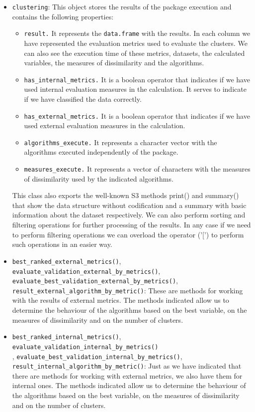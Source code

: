 \begin{itemize}
    \item \texttt{clustering}: This object stores the results of the  package execution and contains the following properties:
    \begin{itemize}
        \item \texttt{result.} It represents the \texttt{data.frame} with the results. In each column we have represented the evaluation metrics used to evaluate the clusters. We can also see the execution time of these metrics, datasets, the calculated variables, the measures of dissimilarity and the algorithms.
        \item \texttt{has\_internal\_metrics.} It is a boolean operator that indicates if we have used internal evaluation measures in the calculation. It serves to indicate if we have classified the data correctly.
        \item \texttt{has\_external\_metrics.} It is a boolean operator that indicates if we have used external evaluation measures in the calculation.
        \item \texttt{algorithms\_execute.} It represents a character vector with the algorithms executed independently of the package.
        \item \texttt{measures\_execute.} It represents a vector of characters with the measures of dissimilarity used by the indicated algorithms.
    \end{itemize}
    This class also exports the well-known S3 methods print() and summary() that show the data
structure without codification and a summary with basic information about the dataset respectively. We can also perform sorting and filtering operations for further processing of the results. In any case if we need to perform filtering operations we can overload the operator ('[') to perform such operations in an easier way.
    \item \texttt{best\_ranked\_external\_metrics()}, \texttt{evaluate\_validation\_external\_by\_metrics()},\\ \texttt{evaluate\_best\_validation\_external\_by\_metrics()},\\ \texttt{result\_external\_algorithm\_by\_metric()}:
    These are methods for working with the results of external metrics. The methods indicated allow us to determine the behaviour of the algorithms based on the best variable, on the measures of dissimilarity and on the number of clusters.

    \item \texttt{best\_ranked\_internal\_metrics()}, \texttt{evaluate\_validation\_internal\_by\_metrics()}\\, \texttt{evaluate\_best\_validation\_internal\_by\_metrics()},\\ \texttt{result\_internal\_algorithm\_by\_metric()}: Just as we have indicated that there are methods for working with external metrics, we also have them for internal ones. The methods indicated allow us to determine the behaviour of the algorithms based on the best variable, on the measures of dissimilarity and on the number of clusters.
\end{itemize}
